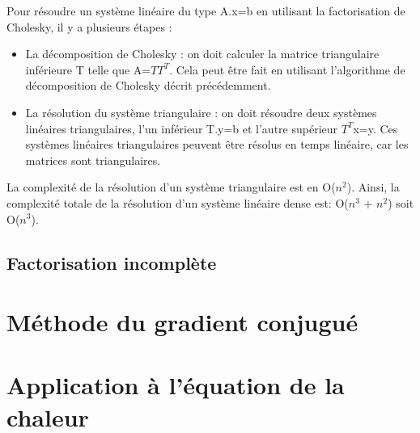 \documentclass{article}
\begin{document}
Pour résoudre un système linéaire du type A.x=b en utilisant la factorisation de Cholesky, il y a plusieurs étapes : 
\begin{itemize}
    \item La décomposition de Cholesky : on doit calculer la matrice triangulaire inférieure T telle que A=$TT^{T}$. Cela peut être fait en utilisant l'algorithme de décomposition de Cholesky décrit précédemment.
    \item La résolution du système triangulaire : on doit résoudre deux systèmes linéaires triangulaires, l'un inférieur T.y=b et l'autre supérieur $T^{T}$x=y. Ces systèmes linéaires triangulaires peuvent être résolus en temps linéaire, car les matrices sont triangulaires. 
\end{itemize}
La complexité de la résolution d'un système triangulaire est en O($n^2$). Ainsi, la complexité totale de la résolution d'un système linéaire dense est: O($n^3$ + $n^2$) soit O($n^3$). 

\subsection{Factorisation incomplète}
\label{ssec:factor_incompl}

\section{Méthode du gradient conjugué}
\label{sec:meth_grad_conj}

\section{Application à l'équation de la chaleur}
\label{sec:eq_chaleur}
\end{document}
